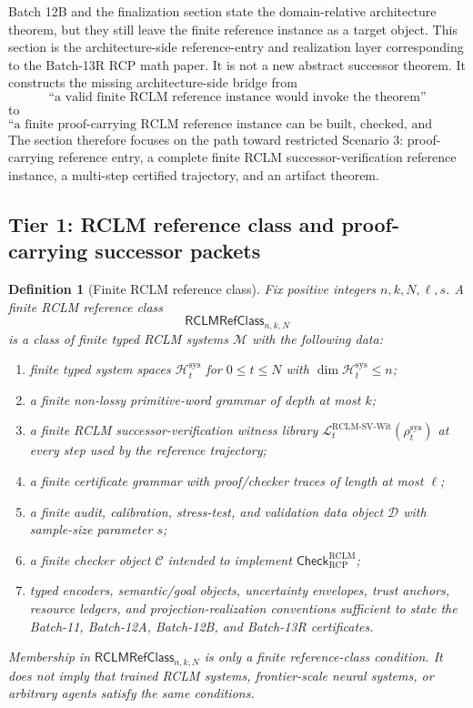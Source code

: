 \documentclass[11pt,a4paper]{article}
\newtheorem{definition}[theorem]{Definition}
\newcommand{\Hcal}{\mathcal H}
\newcommand{\Lcal}{\mathcal L}
\newcommand{\RCP}{\mathrm{RCP}}
\newcommand{\RCLM}{\mathrm{RCLM}}
\newcommand{\sys}{\mathrm{sys}}
\begin{document}
Batch 12B and the finalization section state the domain-relative architecture theorem, but they still leave the finite reference instance as a target object.  This section is the architecture-side reference-entry and realization layer corresponding to the Batch-13R RCP math paper.  It is not a new abstract successor theorem.  It constructs the missing architecture-side bridge from
\[
\text{``a valid finite RCLM reference instance would invoke the theorem''}
\]
to
\[
\text{``a finite proof-carrying RCLM reference instance can be built, checked, and replayed.''}
\]
The section therefore focuses on the path toward restricted Scenario 3: proof-carrying reference entry, a complete finite RCLM successor-verification reference instance, a multi-step certified trajectory, and an artifact theorem.

\begin{center}
\end{center}

\subsection{Tier 1: RCLM reference class and proof-carrying successor packets}

\begin{definition}[Finite RCLM reference class]
\label{def:rclm-batch13r-refclass}
Fix positive integers \(n,k,N,\ell,s\).  A finite RCLM reference class
\[
\mathsf{RCLMRefClass}_{n,k,N}
\]
is a class of finite typed RCLM systems \(\mathcal M\) with the following data:
\begin{enumerate}[label=(\roman*),leftmargin=1.5em]
    \item finite typed system spaces \(\Hcal_t^{\sys}\) for \(0\le t\le N\) with \(\dim\Hcal_t^{\sys}\le n\);
    \item a finite non-lossy primitive-word grammar of depth at most \(k\);
    \item a finite RCLM successor-verification witness library \(\Lcal_t^{\RCLM\text{-}\mathrm{SV\mbox{-}Wit}}(\rho_t^{\sys})\) at every step used by the reference trajectory;
    \item a finite certificate grammar with proof/checker traces of length at most \(\ell\);
    \item a finite audit, calibration, stress-test, and validation data object \(\mathcal D\) with sample-size parameter \(s\);
    \item a finite checker object \(\mathcal C\) intended to implement \(\mathsf{Check}_{\RCP}^{\RCLM}\);
    \item typed encoders, semantic/goal objects, uncertainty envelopes, trust anchors, resource ledgers, and projection-realization conventions sufficient to state the Batch-11, Batch-12A, Batch-12B, and Batch-13R certificates.
\end{enumerate}
Membership in \(\mathsf{RCLMRefClass}_{n,k,N}\) is only a finite reference-class condition.  It does not imply that trained RCLM systems, frontier-scale neural systems, or arbitrary agents satisfy the same conditions.
\end{definition}
\end{document}

